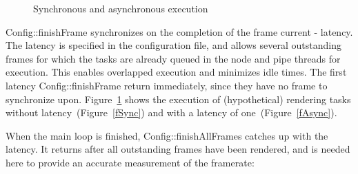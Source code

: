 \documentclass[10pt,a4]{scrartcl}
\newcommand{\fig}[1]{Figure~\ref{#1}}
\begin{document}
\begin{figure}
  \hfil
  {\caption{\small\label{fSyncAsync}Synchronous and asynchronous execution}}
\end{figure}
\textsf{Config::finishFrame} synchronizes on the completion of the frame
\textsf{current - latency}. The latency is specified in the
configuration file, and allows several outstanding frames for which the
tasks are already queued in the node and pipe threads for
execution. This enables overlapped execution and minimizes idle
times. The first \textsf{latency Config::finishFrame} return
immediately, since they have no frame to synchronize
upon. \fig{fSyncAsync} shows the execution of (hypothetical)
rendering tasks without latency~(\fig{fSync}) and with a latency of
one~(\fig{fAsync}).

When the main loop is finished, \textsf{Config::finishAllFrames} catches
up with the latency. It returns after all outstanding frames have been
rendered, and is needed here to provide an accurate measurement of the
framerate:
\end{document}
